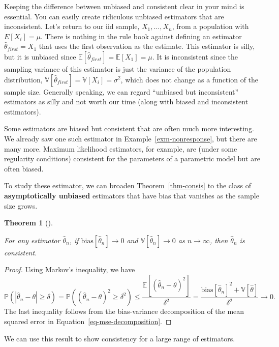 \documentclass[
  13pt,
  letterpaper,
  DIV=11,
  numbers=noendperiod]{scrreprt}
\newcommand{\E}{\mathbb{E}}
\newcommand{\V}{\mathbb{V}}
\renewcommand{\P}{\mathbb{P}}
\theoremstyle{definition}
\theoremstyle{definition}
\theoremstyle{plain}
\newtheorem{theorem}{Theorem}[chapter]
\theoremstyle{remark}
\begin{document}
Keeping the difference between unbiased and consistent clear in your
mind is essential. You can easily create ridiculous unbiased estimators
that are inconsistent. Let's return to our iid sample,
\(X_1, \ldots, X_n\), from a population with \(E[X_i] = \mu\). There is
nothing in the rule book against defining an estimator
\(\widehat{\theta}_{first} = X_1\) that uses the first observation as
the estimate. This estimator is silly, but it is unbiased since
\(\E[\widehat{\theta}_{first}] = \E[X_1] = \mu\). It is inconsistent
since the sampling variance of this estimator is just the variance of
the population distribution,
\(\V[\widehat{\theta}_{first}] = \V[X_i] = \sigma^2\), which does not
change as a function of the sample size. Generally speaking, we can
regard ``unbiased but inconsistent'' estimators as silly and not worth
our time (along with biased and inconsistent estimators).

Some estimators are biased but consistent that are often much more
interesting. We already saw one such estimator in
Example~\ref{exm-nonresponse}, but there are many more. Maximum
likelihood estimators, for example, are (under some regularity
conditions) consistent for the parameters of a parametric model but are
often biased.

To study these estimator, we can broaden Theorem~\ref{thm-consis} to the
class of \textbf{asymptotically unbiased} estimators that have bias that
vanishes as the sample size grows.

\begin{theorem}[]\protect\hypertarget{thm-consis-2}{}\label{thm-consis-2}

For any estimator \(\widehat{\theta}_n\), if
\(\text{bias}[\widehat{\theta}_n] \to 0\) and
\(\V[\widehat{\theta}_n] \rightarrow 0\) as \(n\rightarrow \infty\),
then \(\widehat{\theta}_n\) is consistent.

\end{theorem}

\begin{proof}
Using Markov's inequality, we have \[
\P\left( |\widehat{\theta}_n - \theta| \geq \delta \right) = \P((\widehat{\theta}_n-\theta)^2 \geq \delta^2) \leq \frac{\E[(\widehat{\theta}_n - \theta)^2]}{\delta^2} = \frac{\text{bias}[\widehat{\theta}_n]^2 + \V[\widehat{\theta}]}{\delta^2} \to 0.
\] The last inequality follows from the bias-variance decomposition of
the mean squared error in Equation~\ref{eq-mse-decomposition}.
\end{proof}

We can use this result to show consistency for a large range of
estimators.
\end{document}
